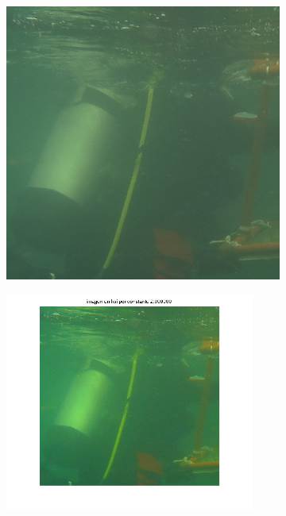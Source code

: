 \documentclass{article}
\begin{document}
\begin{figure}[H]
\begin{subfigure}{0.5\textwidth}
        \includegraphics[scale=0.4]{1908xx.png}
    \end{subfigure}\hfill
	\begin{subfigure}{0.5\textwidth}
	\centering
        \includegraphics[width=0.9\textwidth]{1908xx-sat-por-2.png}
    \end{subfigure}\hfill
	\begin{subfigure}{0.5\textwidth}

\end{subfigure}
\end{figure}
\end{document}
